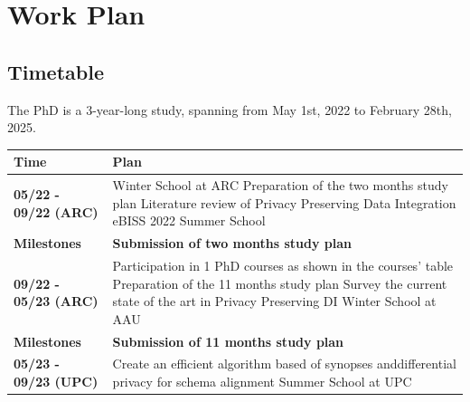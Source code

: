 \documentclass[12pt]{article}
\begin{document}
\section{Work Plan}
\subsection{Timetable}
The PhD is a 3-year-long study, spanning from May 1st, 2022 to February 28th, 2025.
\begin{table}[h]
   \centering
   \begin{tabular}{lp{}}
       \textbf{Time}        & \textbf{Plan}                                                               \\
       \toprule
       \textbf{05/22 - 09/22 (ARC)}   &
       Winter School at ARC \newline
       Preparation of the two months study plan                         \newline
       Literature review of Privacy Preserving Data Integration    \newline
       eBISS 2022 Summer School \\
       \textbf{Milestones}  &
       \textbf{Submission of two months study plan}                                                       \\
       \midrule
       \textbf{09/22 - 05/23 (ARC)} &
       Participation in 1 PhD courses as shown in the courses' table \newline
       Preparation of the 11 months study plan \newline
       Survey the current state of the art in Privacy Preserving DI \newline
       Winter School at AAU \\
       \textbf{Milestones}  &
       \textbf{Submission of 11 months study plan}                                                        \\
       \midrule
       \textbf{05/23 - 09/23 (UPC)}   &
       Create an efficient algorithm based of synopses and\newline differential privacy for schema alignment \newline
       Summer School at UPC                                                                               \\

\end{tabular}
\end{table}
\end{document}
